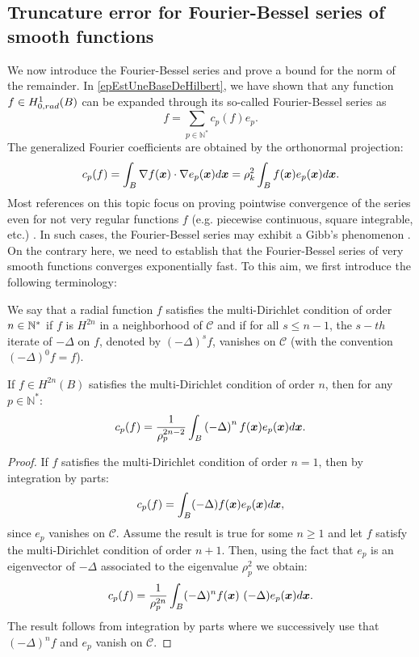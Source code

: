 \documentclass{article}
\begin{document}
\subsection{Truncature error for Fourier-Bessel series of smooth functions}
\label{FourierBesselTruncError}
We now introduce the Fourier-Bessel series and prove a bound for the norm of the remainder. 
In \autoref{epEstUneBaseDeHilbert}, we have shown that any function $f \in H^1_{0,rad}(B)$ can be expanded through its so-called Fourier-Bessel series as
\[f = \sum_{p\in \mathbb{N}^*}c_p(f)e_{p}.\]
The generalized Fourier coefficients are obtained by the orthonormal projection: 
\[c_p(f) = \displaystyle \int_B \nabla f(\boldsymbol{x}) \cdot \nabla e_{p}(\boldsymbol{x}) d\boldsymbol{x} = \rho_k^2 \int_{B}{f(\boldsymbol{x}) e_p(\boldsymbol{x})d\boldsymbol{x}}.\]
Most references on this topic focus on proving pointwise convergence of the series even for not very regular functions $f$ (e.g. piecewise continuous, square integrable, etc.) \cite{stempak2002convergence,guadalupe1993mean,Balodis1999,colzani1993equiconvergence}.  In such cases, the Fourier-Bessel series may exhibit a Gibb's phenomenon \cite{wilton1928gibbs}. On the contrary here, we need to establish that the Fourier-Bessel series of very smooth functions converges exponentially fast. To this aim, we first introduce the following terminology: 
\begin{definition}
	We say that a radial function $f$ satisfies the multi-Dirichlet condition of order $n \in \mathbb{N}^*$ if $f$ is $H^{2n}$ in a neighborhood of $\mathcal{C}$ and if for all $s \leq n-1$, the $s-th$ iterate of $-\Delta$ on $f$, denoted by $(-\Delta)^s f$, vanishes on $\mathcal{C}$ (with the convention $(-\Delta)^0 f = f$). 
\end{definition}
\begin{proposition} 
	\label{DecroissanceFourierBessel}
	If $f \in H^{2n}(B)$ satisfies the multi-Dirichlet condition of order $n$, then for any $p \in \mathbb{N}^*$:
	\[ c_p(f) = \dfrac{1}{\rho_{p}^{2n-2}} \int_{B}\left(-\Delta\right)^{n} f(\boldsymbol{x})e_p(\boldsymbol{x}) d\boldsymbol{x}.\] 
\end{proposition}
\begin{proof}
	If $f$ satisfies the multi-Dirichlet condition of order $n=1$, then by integration by parts:
	\[c_p(f) = \int_{B}(-\Delta)f(\boldsymbol{x}) e_p(\boldsymbol{x})d\boldsymbol{x},\]
	since $e_p$ vanishes on $\mathcal{C}$.
	Assume the result is true for some $n \geq 1$ and let $f$ satisfy the multi-Dirichlet condition of order $n+1$. Then, using the fact that $e_p$ is an eigenvector of $-\Delta$ associated to the eigenvalue $\rho_p^2$ we obtain:
	\[c_p(f) = \frac{1}{\rho_p^{2n}}\int_{B}(-\Delta)^{n}f(\boldsymbol{x})~ (-\Delta) e_p(\boldsymbol{x}) d\boldsymbol{x}.\]
	The result follows from integration by parts where we successively use that $(-\Delta)^{n}f$ and $e_p$ vanish on $\mathcal{C}$.
	
\end{proof}
\end{document}
